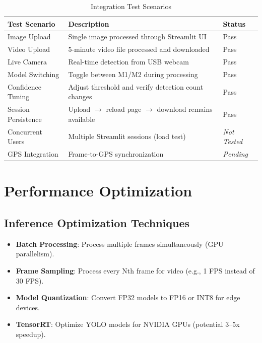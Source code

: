 \documentclass[12pt]{article}
\begin{document}
\begin{table}[H]
    \centering
    \caption{Integration Test Scenarios}
    \label{tab:integration-tests}
    \begin{tabular}{p{}p{}p{}}
        \toprule
        \textbf{Test Scenario} & \textbf{Description} & \textbf{Status} \\
        \midrule
        Image Upload & Single image processed through Streamlit UI & Pass \\
        Video Upload & 5-minute video file processed and downloaded & Pass \\
        Live Camera & Real-time detection from USB webcam & Pass \\
        Model Switching & Toggle between M1/M2 during processing & Pass \\
        Confidence Tuning & Adjust threshold and verify detection count changes & Pass \\
        Session Persistence & Upload $\rightarrow$ reload page $\rightarrow$ download remains available & Pass \\
        Concurrent Users & Multiple Streamlit sessions (load test) & \textit{Not Tested} \\
        GPS Integration & Frame-to-GPS synchronization & \textit{Pending} \\
        \bottomrule
    \end{tabular}
\end{table}

\clearpage

\section{Performance Optimization}

\subsection{Inference Optimization Techniques}

\begin{itemize}
    \item \textbf{Batch Processing}: Process multiple frames simultaneously (GPU parallelism).
    \item \textbf{Frame Sampling}: Process every Nth frame for video (e.g., 1 FPS instead of 30 FPS).
    \item \textbf{Model Quantization}: Convert FP32 models to FP16 or INT8 for edge devices.
    \item \textbf{TensorRT}: Optimize YOLO models for NVIDIA GPUs (potential 3--5x speedup).
\end{itemize}
\end{document}
